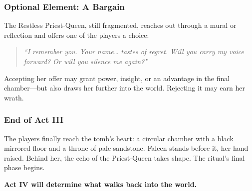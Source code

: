 \subsubsection{Optional Element: A Bargain}

The Restless Priest-Queen, still fragmented, reaches out through a mural or reflection and offers one of the players a choice:

\begin{quote}
    \emph{“I remember you. Your name… tastes of regret. Will you carry my voice forward? Or will you silence me again?”}
\end{quote}

Accepting her offer may grant power, insight, or an advantage in the final chamber—but also draws her further into the world. Rejecting it may earn her wrath.

\subsubsection{End of Act III}

The players finally reach the tomb’s heart: a circular chamber with a black mirrored floor and a throne of pale sandstone. Faleen stands before it, her hand raised. Behind her, the echo of the Priest-Queen takes shape. The ritual’s final phase begins.

\textbf{Act IV will determine what walks back into the world.}

